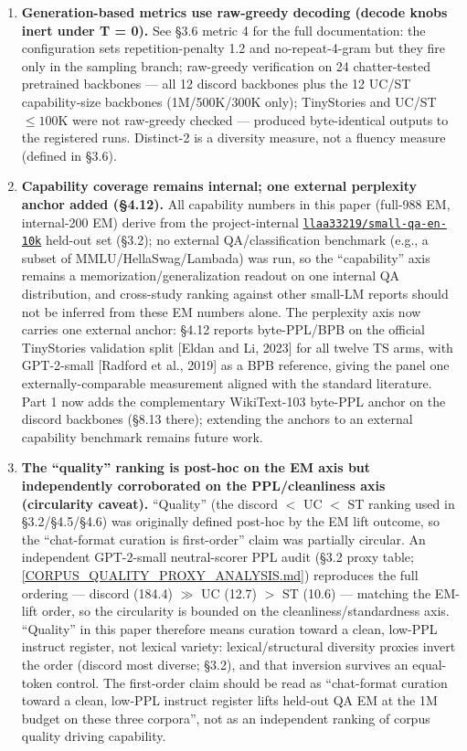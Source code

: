 \documentclass[11pt]{article}
\begin{document}
\begin{enumerate}
  \item \textbf{Generation-based metrics use raw-greedy decoding (decode knobs inert under T = 0).} See \S3.6 metric 4 for the full documentation: the configuration sets repetition-penalty 1.2 and no-repeat-4-gram but they fire only in the sampling branch; raw-greedy verification on 24 chatter-tested pretrained backbones --- all 12 discord backbones plus the 12 UC/ST capability-size backbones (1M/500K/300K only); TinyStories and UC/ST $\leq 100$K were not raw-greedy checked --- produced byte-identical outputs to the registered runs. Distinct-2 is a diversity measure, not a fluency measure (defined in \S3.6).

  \item \textbf{Capability coverage remains internal; one external perplexity anchor added (\S4.12).} All capability numbers in this paper (full-988 EM, internal-200 EM) derive from the project-internal \href{https://huggingface.co/datasets/llaa33219/small-qa-en-10k}{\texttt{llaa33219/small-qa-en-10k}} held-out set (\S3.2); no external QA/classification benchmark (e.g., a subset of MMLU/HellaSwag/Lambada) was run, so the ``capability'' axis remains a memorization/generalization readout on one internal QA distribution, and cross-study ranking against other small-LM reports should not be inferred from these EM numbers alone. The perplexity axis now carries one external anchor: \S4.12 reports byte-PPL/BPB on the official TinyStories validation split [Eldan and Li, 2023] for all twelve TS arms, with GPT-2-small [Radford et al., 2019] as a BPB reference, giving the panel one externally-comparable measurement aligned with the standard literature. Part 1 now adds the complementary WikiText-103 byte-PPL anchor on the discord backbones (\S8.13 there); extending the anchors to an external capability benchmark remains future work.

  \item \textbf{The ``quality'' ranking is post-hoc on the EM axis but independently corroborated on the PPL/cleanliness axis (circularity caveat).} ``Quality'' (the discord $<$ UC $<$ ST ranking used in \S3.2/\S4.5/\S4.6) was originally defined post-hoc by the EM lift outcome, so the ``chat-format curation is first-order'' claim was partially circular. An independent GPT-2-small neutral-scorer PPL audit (\S3.2 proxy table; \href{https://github.com/llaa33219/MicroMixer-4/blob/4bb630413dfa58ef3141291e121ab8c006d03235/CORPUS_QUALITY_PROXY_ANALYSIS.md}{[CORPUS\_QUALITY\_PROXY\_ANALYSIS.md]}) reproduces the full ordering --- discord (184.4) $\gg$ UC (12.7) $>$ ST (10.6) --- matching the EM-lift order, so the circularity is bounded on the cleanliness/standardness axis. ``Quality'' in this paper therefore means curation toward a clean, low-PPL instruct register, not lexical variety: lexical/structural diversity proxies invert the order (discord most diverse; \S3.2), and that inversion survives an equal-token control. The first-order claim should be read as ``chat-format curation toward a clean, low-PPL instruct register lifts held-out QA EM at the 1M budget on these three corpora'', not as an independent ranking of corpus quality driving capability.


\end{enumerate}
\end{document}
